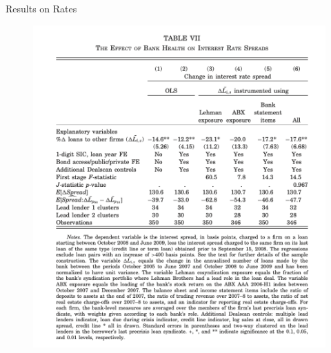 \documentclass[english,xcolor=svgnames]{beamer}
\begin{document}
\begin{frame}{Results on Rates}
\begin{figure}
\includegraphics[scale=0.45]{figures/cr_3}
\end{figure}
\end{frame}
\end{document}
